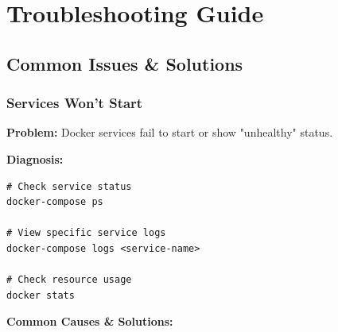 
\chapter{Troubleshooting Guide}

\section{Common Issues \& Solutions}

\subsection{Services Won't Start}

\textbf{Problem:} Docker services fail to start or show "unhealthy" status.

\textbf{Diagnosis:}
\begin{commandbox}
\begin{lstlisting}[style=bashstyle]
# Check service status
docker-compose ps

# View specific service logs
docker-compose logs <service-name>

# Check resource usage
docker stats
\end{lstlisting}
\end{commandbox}

\textbf{Common Causes \& Solutions:}

